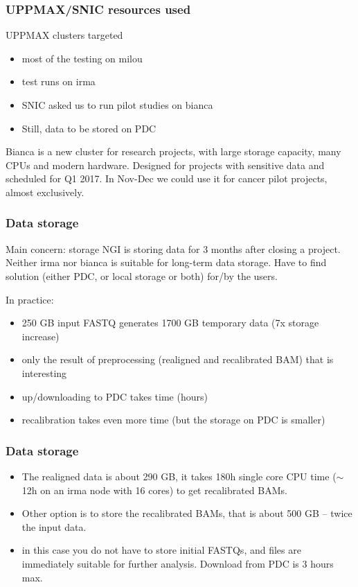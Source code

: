 \documentclass{beamer}
\begin{document}
\begin{frame}
\frametitle{UPPMAX/SNIC resources used}
	\begin{block}{UPPMAX clusters targeted}
		\begin{itemize}
			\item most of the testing on milou
			\item test runs on irma
			\item SNIC asked us to run pilot studies on bianca
			\item Still, data to be stored on PDC
		\end{itemize}
	\end{block}
	Bianca is a new cluster for research projects, with large storage capacity, many CPUs and modern hardware.
	Designed for projects with sensitive data and scheduled for Q1 2017. In Nov-Dec we could use it for cancer pilot
	projects, almost exclusively. 
\end{frame}

\begin{frame}
\frametitle{Data storage}
	\begin{block}{Main concern: storage}
	NGI is storing data for 3 months after closing a project. Neither irma nor bianca is suitable for long-term data
	storage. Have to find solution (either PDC, or local storage or both) for/by the users. 
	\end{block}
	In practice: 
	\begin{itemize}
		\item 250 GB input FASTQ generates 1700 GB temporary data (7x storage increase)
		\item only the result of preprocessing (realigned and recalibrated BAM) that is interesting
		\item up/downloading to PDC takes time (hours)
		\item recalibration takes even more time (but the storage on PDC is smaller)
	\end{itemize}
\end{frame}

\begin{frame}
\frametitle{Data storage}
	\begin{itemize}
		\item The realigned data is about 290 GB, it takes 180h single core CPU time ($\sim$12h on an irma node with 16 cores)
		to get recalibrated BAMs.
		\item Other option is to store the recalibrated BAMs, that is about 500 GB -- twice the input data.
		\item in this case you do not	have to store initial FASTQs, and files are immediately suitable for further analysis.
		Download from PDC is 3 hours max.
	\end{itemize}
\end{frame}
\end{document}

